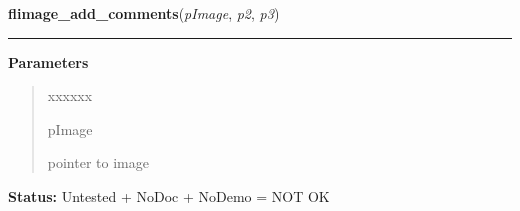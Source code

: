     \label{xformslib:flflimage:flimage_add_comments}

    \vspace{0.5ex}

\hspace{.8\funcindent}\begin{boxedminipage}{\funcwidth}

    \raggedright \textbf{flimage\_add\_comments}(\textit{pImage}, \textit{p2}, \textit{p3})

    \vspace{-1.5ex}

    \rule{\textwidth}{0.5\fboxrule}
\setlength{\parskip}{2ex}
\setlength{\parskip}{1ex}
      \textbf{Parameters}
      \vspace{-1ex}

      \begin{quote}
        \begin{Ventry}{xxxxxx}

          \item[pImage]

          pointer to image

        \end{Ventry}

      \end{quote}

\textbf{Status:} Untested + NoDoc + NoDemo = NOT OK



    \end{boxedminipage}

    \label{xformslib:flflimage:flimage_color_to_pixel}

    \vspace{0.5ex}

